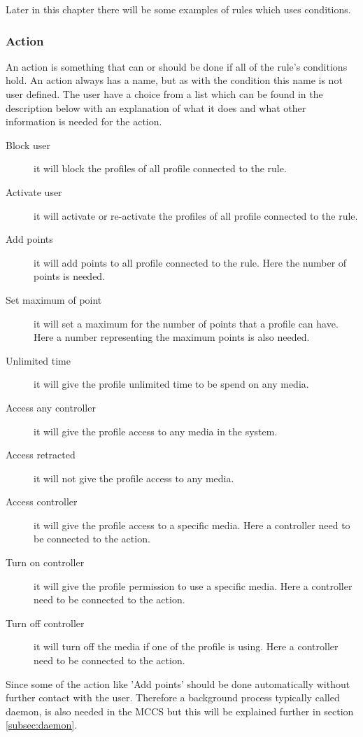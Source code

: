 Later in this chapter there will be some examples of rules which uses conditions.

\subsubsection{Action}
An action is something that can or should be done if all of the rule's conditions hold. An action always has a name, but as with the condition this name is not user defined. The user have a choice from a list which can be found in the description below with an explanation of what it does and what other information is needed for the action.   

\begin{description}
	\item[Block user] it will block the profiles of all profile connected to the rule.
	\item[Activate user] it will activate or re-activate the profiles of all profile connected to the rule.
	\item[Add points] it will add points to all profile connected to the rule. Here the number of points is needed.
	\item[Set maximum of point] it will set a maximum for the number of points that a profile can have. Here a number representing the maximum points is also needed. 
	\item[Unlimited time] it will give the profile unlimited time to be spend on any media. 
	\item[Access any controller] it will give the profile access to any media in the system.
	\item[Access retracted] it will not give the profile access to any media. 
	\item[Access controller] it will give the profile access to a specific media. Here a controller need to be connected to the action.
	\item[Turn on controller] it will give the profile permission to use a specific media. Here a controller need to be connected to the action.
	\item[Turn off controller] it will turn off the media if one of the profile is using. Here a controller need to be connected to the action.
\end{description}
		
Since some of the action like 'Add points' should be done automatically without further contact with the user. Therefore a background process typically called daemon, is also needed in the MCCS but this will be explained further in section \ref{subsec:daemon}. 
	


